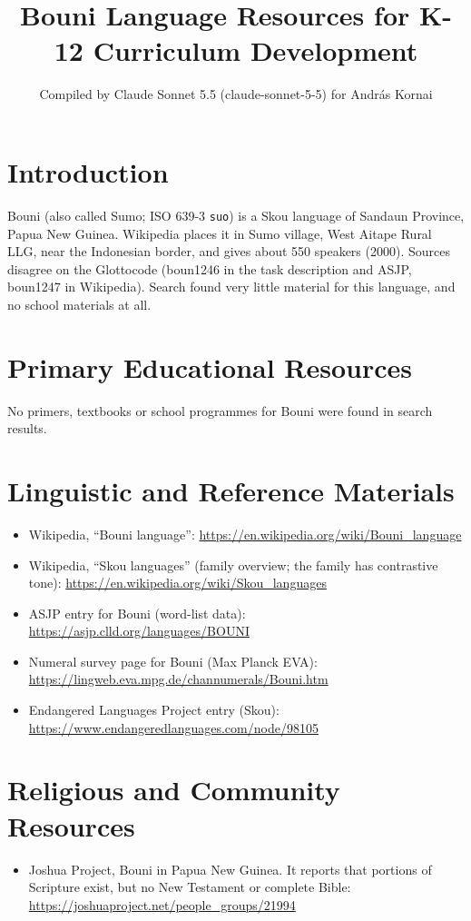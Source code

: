 \documentclass[12pt]{article}
\title{Bouni Language Resources for K-12 Curriculum Development}
\author{Compiled by Claude Sonnet 5.5 (claude-sonnet-5-5) for Andr\'as Kornai}
\date{}
\begin{document}
\maketitle

\section{Introduction}
Bouni (also called Sumo; ISO 639-3 \texttt{suo}) is a Skou language of Sandaun Province, Papua New Guinea. Wikipedia places it in Sumo village, West Aitape Rural LLG, near the Indonesian border, and gives about 550 speakers (2000). Sources disagree on the Glottocode (boun1246 in the task description and ASJP, boun1247 in Wikipedia). Search found very little material for this language, and no school materials at all.

\section{Primary Educational Resources}
No primers, textbooks or school programmes for Bouni were found in search results.

\section{Linguistic and Reference Materials}
\begin{itemize}
\item Wikipedia, ``Bouni language'': \url{https://en.wikipedia.org/wiki/Bouni_language}
\item Wikipedia, ``Skou languages'' (family overview; the family has contrastive tone): \url{https://en.wikipedia.org/wiki/Skou_languages}
\item ASJP entry for Bouni (word-list data): \url{https://asjp.clld.org/languages/BOUNI}
\item Numeral survey page for Bouni (Max Planck EVA): \url{https://lingweb.eva.mpg.de/channumerals/Bouni.htm}
\item Endangered Languages Project entry (Skou): \url{https://www.endangeredlanguages.com/node/98105}
\end{itemize}

\section{Religious and Community Resources}
\begin{itemize}
\item Joshua Project, Bouni in Papua New Guinea. It reports that portions of Scripture exist, but no New Testament or complete Bible: \url{https://joshuaproject.net/people_groups/21994}
\end{itemize}
\end{document}
